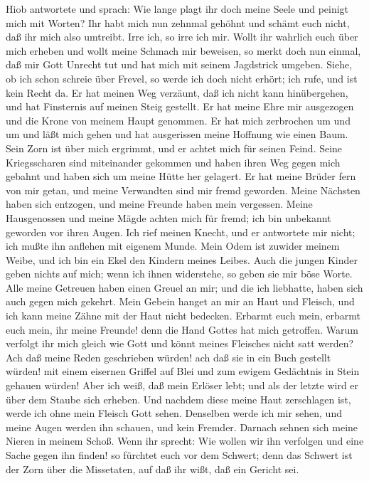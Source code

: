  Hiob antwortete und sprach:  Wie lange plagt
ihr doch meine Seele und peinigt mich mit Worten?  Ihr habt
mich nun zehnmal gehöhnt und schämt euch nicht, daß ihr mich also
umtreibt.  Irre ich, so irre ich mir.  Wollt ihr
wahrlich euch über mich erheben und wollt meine Schmach mir beweisen,
 so merkt doch nun einmal, daß mir Gott Unrecht tut und hat
mich mit seinem Jagdstrick umgeben.  Siehe, ob ich schon
schreie über Frevel, so werde ich doch nicht erhört; ich rufe, und ist
kein Recht da.  Er hat meinen Weg verzäunt, daß ich nicht
kann hinübergehen, und hat Finsternis auf meinen Steig gestellt.
 Er hat meine Ehre mir ausgezogen und die Krone von meinem
Haupt genommen.  Er hat mich zerbrochen um und um und läßt
mich gehen und hat ausgerissen meine Hoffnung wie einen Baum.
 Sein Zorn ist über mich ergrimmt, und er achtet mich für
seinen Feind.  Seine Kriegsscharen sind miteinander
gekommen und haben ihren Weg gegen mich gebahnt und haben sich um meine
Hütte her gelagert.  Er hat meine Brüder fern von mir
getan, und meine Verwandten sind mir fremd geworden.  Meine
Nächsten haben sich entzogen, und meine Freunde haben mein vergessen.
 Meine Hausgenossen und meine Mägde achten mich für fremd;
ich bin unbekannt geworden vor ihren Augen.  Ich rief
meinen Knecht, und er antwortete mir nicht; ich mußte ihn anflehen mit
eigenem Munde.  Mein Odem ist zuwider meinem Weibe, und ich
bin ein Ekel den Kindern meines Leibes.  Auch die jungen
Kinder geben nichts auf mich; wenn ich ihnen widerstehe, so geben sie
mir böse Worte.  Alle meine Getreuen haben einen Greuel an
mir; und die ich liebhatte, haben sich auch gegen mich gekehrt.
 Mein Gebein hanget an mir an Haut und Fleisch, und ich
kann meine Zähne mit der Haut nicht bedecken.  Erbarmt euch
mein, erbarmt euch mein, ihr meine Freunde! denn die Hand Gottes hat
mich getroffen.  Warum verfolgt ihr mich gleich wie Gott
und könnt meines Fleisches nicht satt werden?  Ach daß
meine Reden geschrieben würden! ach daß sie in ein Buch gestellt würden!
 mit einem eisernen Griffel auf Blei und zum ewigem
Gedächtnis in Stein gehauen würden!  Aber ich weiß, daß
mein Erlöser lebt; und als der letzte wird er über dem Staube sich
erheben.  Und nachdem diese meine Haut zerschlagen ist,
werde ich ohne mein Fleisch Gott sehen.  Denselben werde
ich mir sehen, und meine Augen werden ihn schauen, und kein Fremder.
Darnach sehnen sich meine Nieren in meinem Schoß.  Wenn ihr
sprecht: Wie wollen wir ihn verfolgen und eine Sache gegen ihn finden!
 so fürchtet euch vor dem Schwert; denn das Schwert ist der
Zorn über die Missetaten, auf daß ihr wißt, daß ein Gericht sei.

